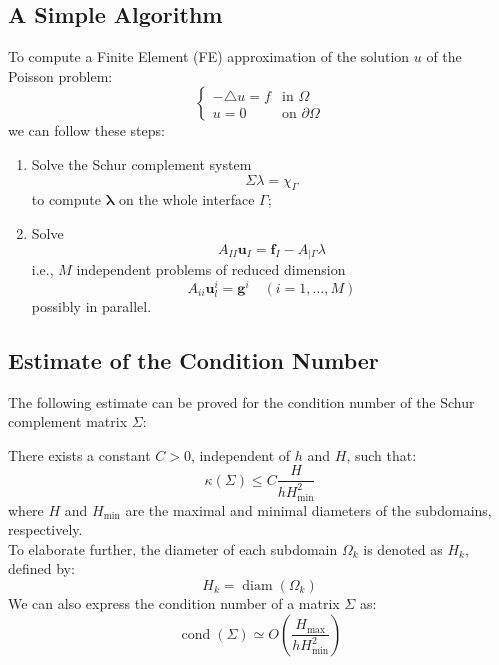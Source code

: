 \documentclass[11pt]{book}
\begin{document}
\subsection*{A Simple Algorithm}
To compute a Finite Element (FE) approximation of the solution \( u \) of the Poisson problem:
\begin{equation*}
\begin{cases}
    -\triangle u = f & \text{in } \Omega \\
    u = 0 & \text{on } \partial \Omega
\end{cases}
\end{equation*}
we can follow these steps:
\begin{enumerate}
    \item Solve the Schur complement system
    \begin{equation*}
        \Sigma \lambda = \chi_{\Gamma}
    \end{equation*}
    to compute \( \boldsymbol{\lambda} \) on the whole interface \( \Gamma \);
    \item Solve
    \begin{equation*}
        A_{II} \mathbf{u}_{I} = \mathbf{f}_{I} - A_{|\Gamma} \lambda
    \end{equation*}
    i.e., \( M \) independent problems of reduced dimension
    \begin{equation*}
        A_{ii} \mathbf{u}_{l}^{i} = \mathbf{g}^{i} \quad (i=1, \ldots, M)
    \end{equation*}
    possibly in parallel.
\end{enumerate}





\subsection*{Estimate of the Condition Number}
The following estimate can be proved for the condition number of the Schur complement matrix \( \Sigma \):

There exists a constant \( C > 0 \), independent of \( h \) and \( H \), such that:
\begin{equation*}
    \kappa(\Sigma) \leq C \frac{H}{h H_{\min}^{2}}
\end{equation*}
where \( H \) and \( H_{\min} \) are the maximal and minimal diameters of the subdomains, respectively. \\
To elaborate further, the diameter of each subdomain \( \Omega_{k} \) is denoted as \( H_{k} \), defined by:
\begin{equation*}
    H_{k} = \operatorname{diam}(\Omega_{k})
\end{equation*}
We can also express the condition number of a  matrix \( \Sigma \) as:
\begin{equation*}
    \operatorname{cond}(\Sigma) \simeq O\left(\frac{H_{\text{max}}}{h H_{\text{min}}^{2}}\right)
\end{equation*}
\end{document}
